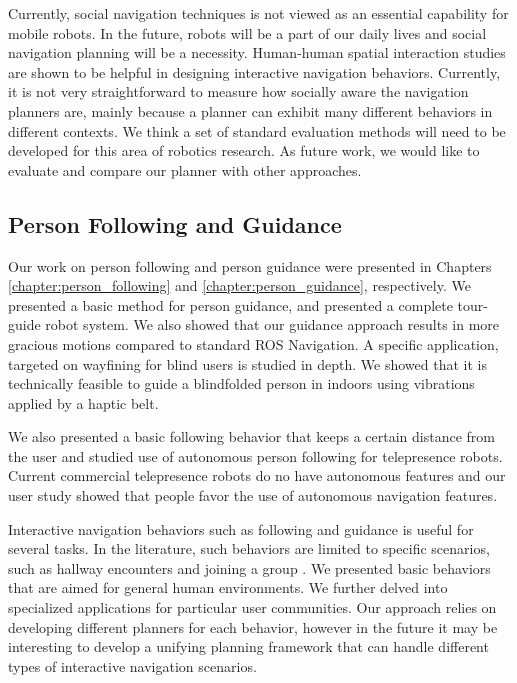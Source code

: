 	
Currently, social navigation techniques is not viewed as an essential capability for mobile robots. In the future, robots will be a part of our daily lives and social navigation planning will be a necessity. Human-human spatial interaction studies are shown to be helpful in designing interactive navigation behaviors. Currently, it is not very straightforward to measure how socially aware the navigation planners are, mainly because a planner can exhibit many different behaviors in different contexts. We think a set of standard evaluation methods will need to be developed for this area of robotics research. As future work, we would like to evaluate and compare our planner with other approaches. 


\subsection{Person Following and Guidance}

Our work on person following and person guidance were presented in Chapters \ref{chapter:person_following} and \ref{chapter:person_guidance}, respectively. We presented a basic method for person guidance, and presented a complete tour-guide robot system. We also showed that our guidance approach results in more gracious motions compared to standard ROS Navigation. A specific application, targeted on wayfining for blind users is studied in depth. We showed that it is technically feasible to guide a blindfolded person in indoors using vibrations applied by a haptic belt.

We also presented a basic following behavior that keeps a certain distance from the user and studied use of autonomous person following for telepresence robots. Current commercial telepresence robots do no have autonomous features and our user study showed that people favor the use of autonomous navigation features.

Interactive navigation behaviors such as following and guidance is useful for several tasks. In the literature, such behaviors are limited to specific scenarios, such as hallway encounters \cite{pacchierotti2005human} and joining a group \cite{althaus2004navigation}. We presented basic behaviors that are aimed for general human environments. We further delved into specialized applications for particular user communities. Our approach relies on developing different planners for each behavior, however in the future it may be interesting to develop a unifying planning framework that can handle different types of interactive navigation scenarios.


